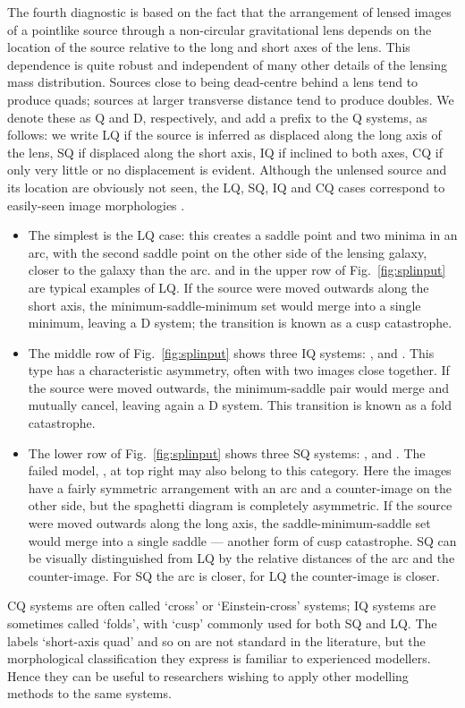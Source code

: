 The fourth diagnostic is based on the fact that the arrangement of
lensed images of a pointlike source through a non-circular
gravitational lens depends on the location of the source relative to
the long and short axes of the lens.  This dependence is quite robust
and independent of many other details of the lensing mass
distribution.  Sources close to being dead-centre behind a lens tend
to produce quads; sources at larger transverse distance tend to
produce doubles.  We denote these as Q and D, respectively, and add a
prefix to the Q systems, as follows: we write LQ if the source is
inferred as displaced along the long axis of the lens, SQ if displaced
along the short axis, IQ if inclined to both axes, CQ if only very little or
no displacement is evident.  Although the
unlensed source and its location are obviously not seen, the LQ, SQ, IQ and CQ
cases correspond to easily-seen image morphologies \citep[see,
  e.g.,][]{2003AJ....125.2769S}.
\begin{itemize}
\item The simplest is the LQ case: this creates a saddle point and two
  minima in an arc, with the second saddle point on the other side of
  the lensing galaxy, closer to the galaxy than the arc.  
  and  in the upper row of Fig.~\ref{fig:splinput} are typical
  examples of LQ.  If the source were moved outwards along the short
  axis, the minimum-saddle-minimum set would merge into a single minimum,
  leaving a D system; the transition is known as a cusp catastrophe.
\item The middle row of Fig.~\ref{fig:splinput} shows three IQ
  systems: ,  and .  This type has a characteristic
  asymmetry, often with two images close together.  If the source
  were moved outwards, the minimum-saddle pair would merge and
  mutually cancel, leaving again a D system. This transition is known
  as a fold catastrophe.
\item The lower row of Fig.~\ref{fig:splinput} shows three SQ
  systems: ,  and . The failed model, , at top right
  may also belong to this category.  Here the images have a
  fairly symmetric arrangement with an arc and a counter-image on the
  other side, but the spaghetti diagram is completely asymmetric.  If
  the source were moved outwards along the long axis, the
  saddle-minimum-saddle set  would merge into a single saddle --- another
  form of cusp catastrophe.  SQ can be visually distinguished from LQ
  by the relative distances of the arc and the counter-image.  For
  SQ the arc is closer, for LQ the counter-image is closer.
\end{itemize}
CQ systems are often called `cross' or `Einstein-cross' systems; IQ
systems are sometimes called `folds', with `cusp' commonly used for
both SQ and LQ.  The labels `short-axis quad' and so on are not
standard in the literature, but the morphological classification they
express is familiar to experienced modellers.  Hence they can be
useful to researchers wishing to apply other modelling methods to the
same systems.


